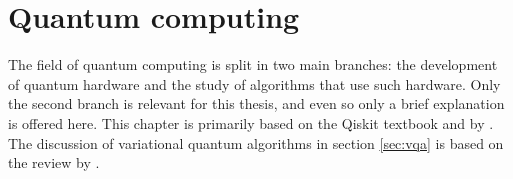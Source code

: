 \chapter{Quantum computing}
\label{chap:qc}
The field of quantum computing is split in two main branches: the development of quantum hardware and the study of algorithms that use such hardware.
Only the second branch is relevant for this thesis, and even so only a brief explanation is offered here.
This chapter is primarily based on the Qiskit textbook \cite{qiskit_textbook} and  by \textcite{textbook_2nd}.
The discussion of variational quantum algorithms in section \ref{sec:vqa} is based on the review by \textcite{cerezo2021}.









